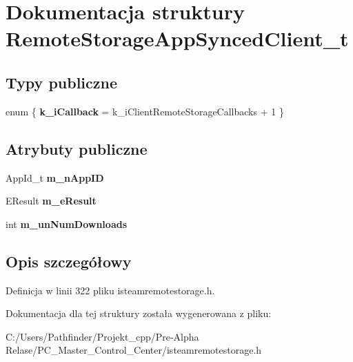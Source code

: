 \hypertarget{struct_remote_storage_app_synced_client__t}{}\section{Dokumentacja struktury Remote\+Storage\+App\+Synced\+Client\+\_\+t}
\label{struct_remote_storage_app_synced_client__t}
\subsection*{Typy publiczne}
\begin{DoxyCompactItemize}
\item 
\mbox{\label{struct_remote_storage_app_synced_client__t_ac4d48baf90e2dc5e45bc1e771bbd607c}} 
enum \{ {\bfseries k\+\_\+i\+Callback} = k\+\_\+i\+Client\+Remote\+Storage\+Callbacks + 1
 \}
\end{DoxyCompactItemize}
\subsection*{Atrybuty publiczne}
\begin{DoxyCompactItemize}
\item 
\mbox{\label{struct_remote_storage_app_synced_client__t_a69ffe362ce5aacbf6a455c79c12dd405}} 
App\+Id\+\_\+t {\bfseries m\+\_\+n\+App\+ID}
\item 
\mbox{\label{struct_remote_storage_app_synced_client__t_a0a52dce225939f7d96db7ab627a080b6}} 
E\+Result {\bfseries m\+\_\+e\+Result}
\item 
\mbox{\label{struct_remote_storage_app_synced_client__t_ad38050d41af41128d7878daad208bf19}} 
int {\bfseries m\+\_\+un\+Num\+Downloads}
\end{DoxyCompactItemize}


\subsection{Opis szczegółowy}


Definicja w linii 322 pliku isteamremotestorage.\+h.



Dokumentacja dla tej struktury została wygenerowana z pliku\+:\begin{DoxyCompactItemize}
\item 
C\+:/\+Users/\+Pathfinder/\+Projekt\+\_\+cpp/\+Pre-\/\+Alpha Relase/\+P\+C\+\_\+\+Master\+\_\+\+Control\+\_\+\+Center/isteamremotestorage.\+h\end{DoxyCompactItemize}
